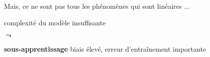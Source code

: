 \begin{frame}{\vskip -0.35cm\Large Mais, ce ne sont pas tous les ph\'enom\`enes qui sont lin\'eaires ...}
\begin{multicols}{2}
\end{multicols}

\pause
\begin{center}
\vskip -0.15cm
\large
	\begin{minipage}{4.0cm}
		\begin{center}
		{\large complexit\'e du mod\`ele \vskip -0.05cm insuffisante}
		\end{center}
	\end{minipage}
\;\;$\leadsto$\quad
	\begin{minipage}{5.2cm}
		\begin{center}
		\textbf{\Large\color{red}sous-apprentissage} \vskip -0.1cm {\scriptsize biais \'elev\'e, erreur d'entra\^inement importante}
		\end{center}
	\end{minipage}
\end{center}

\end{frame}
\normalsize

